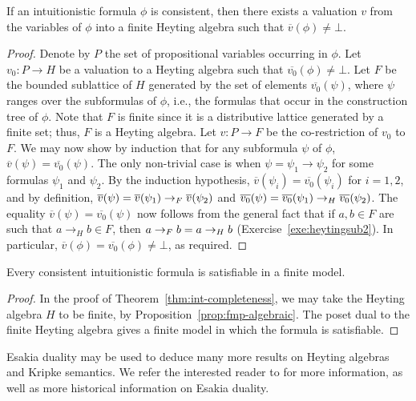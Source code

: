 \begin{proposition}\label{prop:fmp-algebraic}
  If an intuitionistic formula $\phi$ is consistent, then there exists a valuation $v$ from the variables of $\phi$ into a finite Heyting algebra such that $\overline{v}(\phi) \neq \bot$.
\end{proposition}
\begin{proof}
Denote by $P$ the set of propositional variables occurring in $\phi$. Let $v_0 \colon P \to H$ be a valuation to a Heyting algebra such that $\overline{v_0}(\phi) \neq \bot$. Let $F$ be the bounded sublattice of $H$ generated by the set of elements $\overline{v_0}(\psi)$, where $\psi$ ranges over the subformulas of $\phi$, i.e., the formulas that occur in the construction tree of $\phi$. Note that $F$ is finite since it is a distributive lattice generated by a finite set; thus, $F$ is a Heyting algebra. Let $v \colon P \to F$ be the co-restriction of $v_0$ to $F$. We may now show by induction that for any subformula $\psi$ of $\phi$, $\overline{v}(\psi) = \overline{v_0}(\psi)$. The only non-trivial case is when $\psi = \psi_1 \to \psi_2$ for some formulas $\psi_1$ and $\psi_2$. By the induction hypothesis, $\overline{v}(\psi_i) = \overline{v_0}(\psi_i)$ for $i = 1, 2$, and by definition, $\overline{v}(\psi) = \overline{v}(\psi_1) \to_F \overline{v}(\psi_2)$ and $\overline{v_0}(\psi) = \overline{v_0}(\psi_1) \to_H \overline{v_0}(\psi_2)$. The equality $\overline{v}(\psi) = \overline{v_0}(\psi)$ now follows from the general fact that if $a, b \in F$ are such that $a \to_H b \in F$, then $a \to_F b = a \to_H b$ (Exercise~\ref{exe:heytingsub2}). In particular, $\overline{v}(\phi) = \overline{v_0}(\phi) \neq \bot$, as required.
\end{proof}
\begin{corollary}
Every consistent intuitionistic formula is satisfiable in a finite model.
\end{corollary}
\begin{proof}
  In the proof of Theorem~\ref{thm:int-completeness}, we may take the Heyting algebra $H$ to be finite, by Proposition~\ref{prop:fmp-algebraic}. The poset dual to the finite Heyting algebra gives a finite model in which the formula is satisfiable.
\end{proof}
 Esakia duality may be used to deduce many more results on Heyting algebras and Kripke semantics. We refer the interested reader to \cite{GehEsak} for more information, as well as more historical information on Esakia duality.

\exercises


